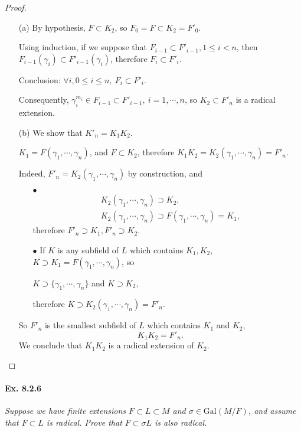 \documentclass[11pt,a4paper]{article}
\newcommand{\be} {\begin{enumerate}}
\newcommand{\ee} {\end{enumerate}}
\newcommand{\Gal}{\mathrm{Gal}}
\begin{document}
\begin{proof}
\begin{enumerate}
\item[(a)]
By hypothesis, $F\subset K_2$, so $F_0=F \subset K_2 = F'_0$.

Using induction, if we suppose that $F_{i-1} \subset F'_{i-1}, 1\leq i < n$, then $F_{i-1}(\gamma_i) \subset F'_{i-1}(\gamma_i)$,  therefore $F_i \subset F'_i$.

Conclusion: $\forall i, 0 \leq i \leq n, \ F_i \subset F'_i$.

Consequently, $\gamma_i^{m_i} \in F_{i-1} \subset F'_{i-1}, \ i=1,\cdots,n$, so  $K_2 \subset F'_n$ is a radical extension.

\item[(b)]
We show that $K'_n = K_1K_2$.

$K_1 = F(\gamma_1,\cdots,\gamma_n)$, and $F \subset K_2$, therefore $K_1K_2 = K_2(\gamma_1,\cdots,\gamma_n) = F'_n$.

Indeed, $F'_n =  K_2(\gamma_1,\cdots,\gamma_n)$ by construction, and
\be
\item[$\bullet$] 
\begin{align*}
& K_2(\gamma_1,\cdots,\gamma_n) \supset K_2,\\
& K_2(\gamma_1,\cdots,\gamma_n) \supset F(\gamma_1,\cdots,\gamma_n) = K_1,
\end{align*}
therefore $F'_n \supset K_1, F'_n\supset K_2$.

\item[$\bullet$]If $K$ is any subfield of $L$ which contains $K_1,K_2$, $K \supset K_1 =F(\gamma_1,\cdots,\gamma_n)$, so
\begin{center}
 $K \supset \{\gamma_1,\cdots,\gamma_n\}$ and $ K \supset K_2,$
\end{center}
therefore $K \supset  K_2(\gamma_1,\cdots,\gamma_n) = F'_n$.
\ee
So $F'_n$ is the smallest subfield of $L$ which contains $K_1$ and $K_2$,
$$ K_1K_2 = F'_n.$$
We conclude that $K_1K_2$ is a radical extension of $K_2$.

\end{enumerate}
\end{proof}

\paragraph{Ex. 8.2.6}

{\it Suppose we have finite extensions $F \subset L \subset M$ and $\sigma \in \Gal(M/F)$, and assume that $F\subset L$ is radical. Prove that $F \subset\sigma L$ is also radical.
}
\end{document}
